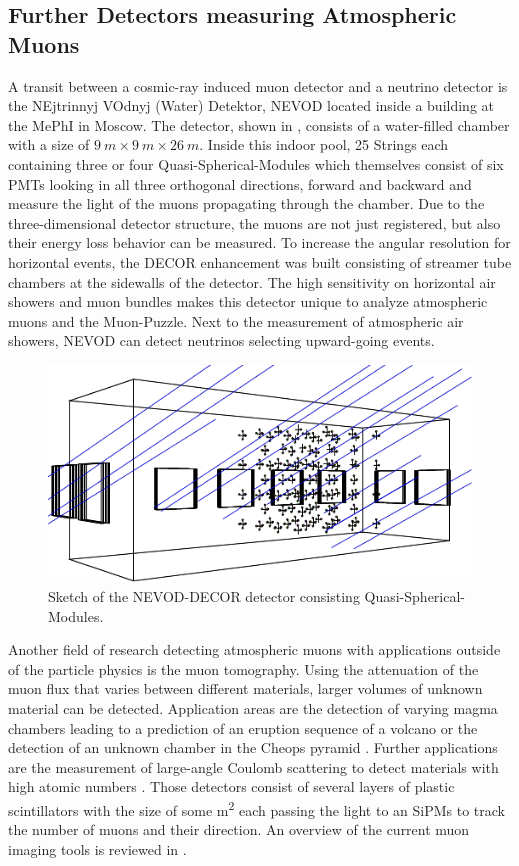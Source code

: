 \subsection{Further Detectors measuring Atmospheric Muons}

A transit between a cosmic-ray induced muon detector and a neutrino detector is the NEjtrinnyj VOdnyj (Water) Detektor, NEVOD \cite{NEVOD15} located inside a building  at the MePhI in Moscow.
The detector, shown in , consists of a water-filled chamber with a size of $\SI{9}{m} \times \SI{9}{m} \times \SI{26}{m}$.
Inside this indoor pool, 25 Strings each containing three or four Quasi-Spherical-Modules which themselves consist of six PMTs looking in all three orthogonal directions, forward and backward and measure the light of the muons propagating through the chamber.
Due to the three-dimensional detector structure, the muons are not just registered, but also their energy loss behavior can be measured.
To increase the angular resolution for horizontal events, the DECOR enhancement was built consisting of streamer tube chambers at the sidewalls of the detector.
The high sensitivity on horizontal air showers and muon bundles makes this detector unique to analyze atmospheric muons and the Muon-Puzzle.
Next to the measurement of atmospheric air showers, NEVOD can detect neutrinos selecting upward-going events.
\begin{figure}
    \centering
    \includegraphics[width=\textwidth]{./images/detector_nevod.pdf}
    \caption{Sketch of the NEVOD-DECOR detector consisting Quasi-Spherical-Modules. \cite{NEVOD18}}
    \label{fig:detect_nevod}
\end{figure}

Another field of research detecting atmospheric muons with applications outside of the particle physics is the muon tomography.
Using the attenuation of the muon flux that varies between different materials, larger volumes of unknown material can be detected.
Application areas are the detection of varying magma chambers leading to a prediction of an eruption sequence of a volcano \cite{Tanaka09} or the detection of an unknown chamber in the Cheops pyramid \cite{Morishima17}.
Further applications are the measurement of large-angle Coulomb scattering to detect materials with high atomic numbers \cite{Borozdin03}.
Those detectors consist of several layers of plastic scintillators with the size of some \si{m^2} each passing the light to an SiPMs to track the number of muons and their direction.
An overview of the current muon imaging tools is reviewed in \cite{Bonechi19}.

